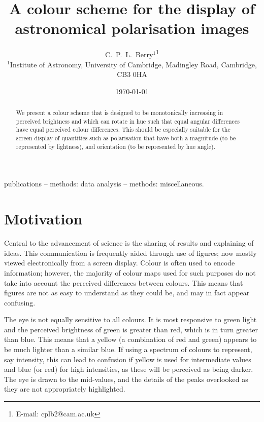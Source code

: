 \documentclass[useAMS,usedcolumn,usegraphicx,usenatbib]{mn2e}
\title[A colour scheme for the display of astronomical polarisation images]{A colour scheme for the display of astronomical polarisation images}
\author[C.\ P.\ L.\ Berry]{C.\ P.\ L.\ Berry$^{1}$\thanks{E-mail: cplb2@cam.ac.uk}\\
$^{1}$Institute of Astronomy, University of Cambridge, Madingley Road, Cambridge, CB3 0HA}
\begin{document}
\date{\today}

\pagerange{\pageref{firstpage}--\pageref{lastpage}} 

\maketitle

\label{firstpage}

\begin{abstract}
We present a colour scheme that is designed to be monotonically increasing in perceived brightness and which can rotate in hue such that equal angular differences have equal perceived colour differences. This should be especially suitable for the screen display of quantities such as polarisation that have both a magnitude (to be represented by lightness), and orientation (to be represented by hue angle).
\end{abstract}

\begin{keywords}
publications -- methods: data analysis -- methods: miscellaneous.
\end{keywords}

\section{Motivation}\label{sec:Intro}

Central to the advancement of science is the sharing of results and explaining of ideas. This communication is frequently aided through use of figures; now mostly viewed electronically from a screen display. Colour is often used to encode information; however, the majority of colour maps used for such purposes do not take into account the perceived differences between colours. This means that figures are not as easy to understand as they could be, and may in fact appear confusing.

The eye is not equally sensitive to all colours. It is most responsive to green light and the perceived brightness of green is greater than red, which is in turn greater than blue. This means that a yellow (a combination of red and green) appears to be much lighter than a similar blue. If using a spectrum of colours to represent, say intensity, this can lead to confusion if yellow is used for intermediate values and blue (or red) for high intensities, as these will be perceived as being darker. The eye is drawn to the mid-values, and the details of the peaks overlooked as they are not appropriately highlighted.
\end{document}
